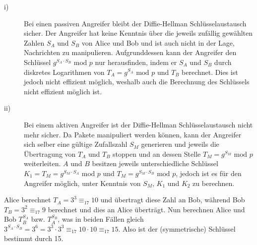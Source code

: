 \documentclass{../exercisesheet}
\begin{document}
\begin{exercise}{4}
\begin{subexercise}
\begin{description}
\item[i)] Bei einen passiven Angreifer bleibt der Diffie-Hellman Schlüsselaustausch sicher. Der Angreifer hat keine Kenntnis über die jeweils zufällig gewählten Zahlen $S_A$ und $S_B$
von Alice und Bob und ist auch nicht in der Lage, Nachrichten zu manipulieren. Aufgrunddessen kann der Angreifer den Schlüssel $g^{S_A \cdot S_B} \text{ mod } p$ nur herausfinden, 
indem er $S_A$ und $S_B$ durch diskretes Logarithmen von $T_A=g^{S_A} \text{ mod }p$ und $T_B$ berechnet. Dies ist jedoch nicht effizient möglich, weshalb auch die Berechnung
des Schlüssels nicht effizient möglich ist.

\item[ii)] Bei einem aktiven Angreifer ist der Diffie-Hellman Schlüsselaustausch nicht mehr sicher. Da Pakete manipuliert werden können, kann der Angreifer sich selber eine gültige Zufallszahl
$S_M$ generieren und jeweils die Übertragung von $T_A$ und $T_B$ stoppen und an dessen Stelle $T_M=g^{S_M} \text{ mod }p$ weiterleiten. $A$ und $B$ besitzen jeweils
unterschiedliche Schlüssel $K_1=T_M=g^{S_M \cdot S_A} \text{ mod }p$ und $T_M=g^{S_M \cdot S_B} \text{ mod }p$, jedoch ist es für den Angreifer möglich, unter Kenntnis
von $S_M$, $K_1$ und $K_2$ zu berechnen.
\end{description}
\end{subexercise}
\begin{subexercise}
Alice berechnet $T_A=3^3 \equiv_{17} 10$ und übertragt diese Zahl an Bob, während Bob $T_B=3^2 \equiv_{17} 9$ berechnet und dies an Alice überträgt.
Nun berechnen Alice und Bob $T_B^{S_A}$ bzw. $T_A^{S_B}$, was in beiden Fällen gleich $3^{S_A \cdot S_B} = 3^6 = 3^3 \cdot 3^3 \equiv_{17} 10 \cdot 10 \equiv_{17} 15$.
Also ist der (symmetrische) Schlüssel bestimmt durch 15.
\end{subexercise}
\end{exercise}
\end{document}
